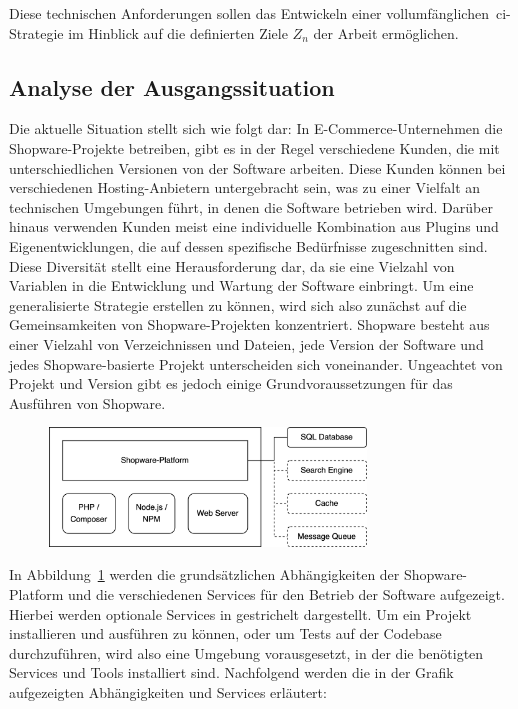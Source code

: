 Diese technischen Anforderungen sollen das Entwickeln einer vollumfänglichen\ \acrshort{ci}-Strategie im Hinblick auf
die definierten Ziele $Z_n$ der Arbeit ermöglichen.

\subsection{Analyse der Ausgangssituation} \label{subsec:03-concept-2}

Die aktuelle Situation stellt sich wie folgt dar: In E-Commerce-Unternehmen die Shopware-Projekte betreiben, gibt es in
der Regel verschiedene Kunden, die mit unterschiedlichen Versionen von der Software arbeiten.
Diese Kunden können bei verschiedenen Hosting-Anbietern untergebracht sein, was zu einer Vielfalt an technischen
Umgebungen führt, in denen die Software betrieben wird.
Darüber hinaus verwenden Kunden meist eine individuelle Kombination aus Plugins und Eigenentwicklungen, die auf dessen
spezifische Bedürfnisse zugeschnitten sind.
Diese Diversität stellt eine Herausforderung dar, da sie eine Vielzahl von Variablen in die Entwicklung und Wartung der
Software einbringt.
Um eine generalisierte Strategie erstellen zu können, wird sich also zunächst auf die Gemeinsamkeiten von
Shopware-Projekten konzentriert.
Shopware besteht aus einer Vielzahl von Verzeichnissen und Dateien, jede Version der Software und jedes
Shopware-basierte Projekt unterscheiden sich voneinander.
Ungeachtet von Projekt und Version gibt es jedoch einige Grundvoraussetzungen für das Ausführen von Shopware.

\begin{figure}[H]
    \centering
    \includegraphics[width=0.75\textwidth]{images/content/shopware-requirements}
    \label{fig:shopware-requirements}
\end{figure}

In Abbildung\ \ref{fig:shopware-requirements} werden die grundsätzlichen Abhängigkeiten der Shopware-Platform und die
verschiedenen Services für den Betrieb der Software aufgezeigt.
Hierbei werden optionale Services in gestrichelt dargestellt.
Um ein Projekt installieren und ausführen zu können, oder um Tests auf der Codebase durchzuführen, wird also eine
Umgebung vorausgesetzt, in der die benötigten Services und Tools installiert sind.
Nachfolgend werden die in der Grafik aufgezeigten Abhängigkeiten und Services erläutert:

